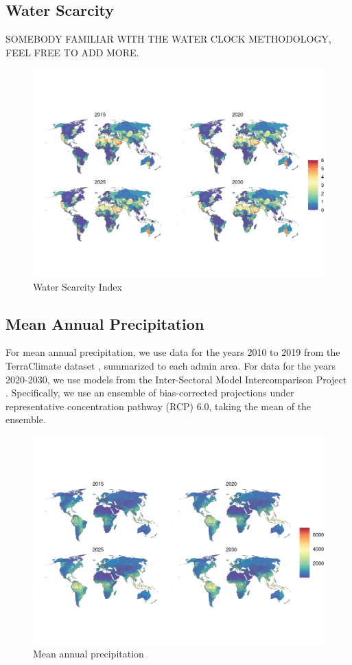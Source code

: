 \documentclass{article}
\begin{document}
\subsection{Water Scarcity}
SOMEBODY FAMILIAR WITH THE WATER CLOCK METHODOLOGY, FEEL FREE TO ADD MORE.
\begin{figure}[H]
  \centering
  \includegraphics[width=\linewidth]{img/covars/wci_index.png}
  \caption{Water Scarcity Index}
\end{figure}


\subsection{Mean Annual Precipitation}
For mean annual precipitation, we use data for the years 2010 to 2019 from the TerraClimate dataset \citep{abatzoglou2018terraclimate}, summarized to each admin area.  For data for the years 2020-2030, we use models from the Inter-Sectoral Model Intercomparison Project \citep{warszawski2014inter}.  Specifically, we use an ensemble of bias-corrected projections under representative concentration pathway (RCP) 6.0, taking the mean of the ensemble.

\begin{figure}[H]
  \centering
  \includegraphics[width=\linewidth]{img/covars/precip.png}
  \caption{Mean annual precipitation}
\end{figure}
\end{document}
